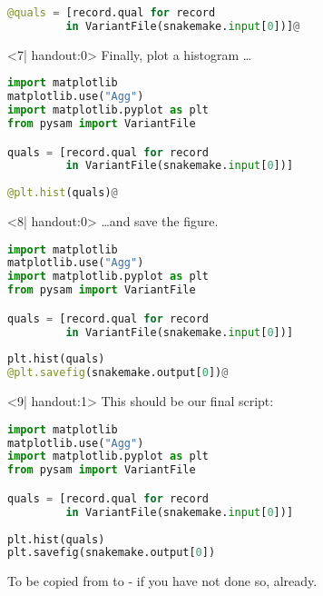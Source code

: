 \begin{frame}[fragile]
\begin{onlyenv}
\begin{lstlisting}[language=Python,style=Python]
@quals = [record.qual for record 
         in VariantFile(snakemake.input[0])]@
   \end{lstlisting}
  \end{onlyenv}
  \begin{onlyenv}<7| handout:0>
   Finally, plot a histogram \ldots
   \begin{lstlisting}[language=Python,style=Python]
import matplotlib
matplotlib.use("Agg")
import matplotlib.pyplot as plt
from pysam import VariantFile

quals = [record.qual for record 
         in VariantFile(snakemake.input[0])]
         
@plt.hist(quals)@
   \end{lstlisting}
  \end{onlyenv}
  \begin{onlyenv}<8| handout:0>
   \ldots and save the figure.
   \begin{lstlisting}[language=Python,style=Python]
import matplotlib
matplotlib.use("Agg")
import matplotlib.pyplot as plt
from pysam import VariantFile

quals = [record.qual for record 
         in VariantFile(snakemake.input[0])]
         
plt.hist(quals)
@plt.savefig(snakemake.output[0])@
   \end{lstlisting}
  \end{onlyenv}
  \begin{onlyenv}<9| handout:1>
   This should be our final script:
   \begin{lstlisting}[language=Python,style=Python]
import matplotlib
matplotlib.use("Agg")
import matplotlib.pyplot as plt
from pysam import VariantFile

quals = [record.qual for record 
         in VariantFile(snakemake.input[0])]
         
plt.hist(quals)
plt.savefig(snakemake.output[0])
   \end{lstlisting}
  To be copied from  to  - if you have not done so, already.
  \end{onlyenv}
\end{frame}


